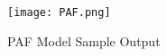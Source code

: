 \begin{figure}[h!]
  \centering \texttt{[image: PAF.png]}
  \caption{PAF Model Sample Output}
  \label{fig:PAF}
\end{figure}



    

    
    
